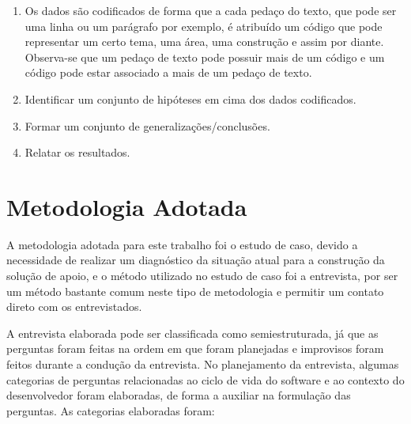 \begin{enumerate}
\item Os dados são codificados de forma que a cada pedaço do texto, que pode ser uma linha ou um parágrafo por exemplo, é atribuído um código que pode representar um certo tema, uma área, uma construção e assim por diante. Observa-se que um pedaço de texto pode possuir mais de um código e um código pode estar associado a mais de um pedaço de texto.
\item Identificar um conjunto de hipóteses em cima dos dados codificados.
\item Formar um conjunto de generalizações/conclusões.
\item Relatar os resultados.
\end{enumerate}

\section{Metodologia Adotada}

A metodologia adotada para este trabalho foi o estudo de caso, devido a necessidade de realizar um diagnóstico da situação atual para a construção da solução de apoio, e o método utilizado no estudo de caso foi a entrevista, por ser um método bastante comum neste tipo de metodologia e permitir um contato direto com os entrevistados. 

A entrevista elaborada pode ser classificada como semiestruturada, já que as perguntas foram feitas na ordem em que foram planejadas e improvisos foram feitos durante a condução da entrevista. No planejamento da entrevista, algumas categorias de perguntas relacionadas ao ciclo de vida do software e ao contexto do desenvolvedor foram elaboradas, de forma a auxiliar na formulação das perguntas. As categorias elaboradas foram:

